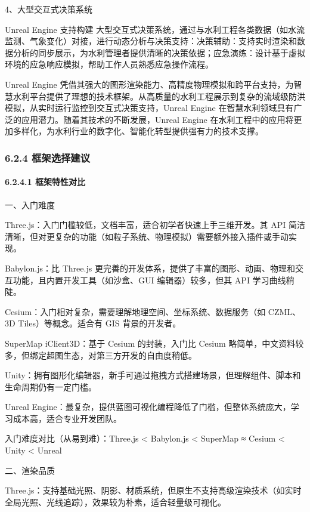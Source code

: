 4、大型交互式决策系统

Unreal Engine 支持构建 大型交互式决策系统，通过与水利工程各类数据（如水流监测、气象变化）对接，进行动态分析与决策支持：决策辅助：支持实时渲染和数据分析的同步展示，为水利管理者提供清晰的决策依据；应急演练：设计基于虚拟环境的应急响应模拟，帮助工作人员熟悉应急操作流程。

Unreal Engine 凭借其强大的图形渲染能力、高精度物理模拟和跨平台支持，为智慧水利平台提供了理想的技术框架。从高质量的水利工程展示到复杂的流域级防洪模拟，从实时运行监控到交互式决策支持，Unreal Engine 在智慧水利领域具有广泛的应用潜力。随着其技术的不断发展，Unreal Engine 在水利工程中的应用将更加多样化，为水利行业的数字化、智能化转型提供强有力的技术支撑。

\subsubsection{6.2.4 框架选择建议}\label{ux6846ux67b6ux9009ux62e9ux5efaux8bae}

\paragraph{6.2.4.1 框架特性对比}\label{ux6846ux67b6ux7279ux6027ux5bf9ux6bd4}

一、入门难度

Three.js：入门门槛较低，文档丰富，适合初学者快速上手三维开发。其 API 简洁清晰，但对更复杂的功能（如粒子系统、物理模拟）需要额外接入插件或手动实现。

Babylon.js：比 Three.js 更完善的开发体系，提供了丰富的图形、动画、物理和交互功能，且内置开发工具（如沙盒、GUI 编辑器）较多，但其 API 学习曲线稍陡。

Cesium：入门相对复杂，需要理解地理空间、坐标系统、数据服务（如 CZML、3D Tiles）等概念。适合有 GIS 背景的开发者。

SuperMap iClient3D：基于 Cesium 的封装，入门比 Cesium 略简单，中文资料较多，但绑定超图生态，对第三方开发的自由度稍低。

Unity：拥有图形化编辑器，新手可通过拖拽方式搭建场景，但理解组件、脚本和生命周期仍有一定门槛。

Unreal Engine：最复杂，提供蓝图可视化编程降低了门槛，但整体系统庞大，学习成本高，适合专业开发团队。

入门难度对比（从易到难）：Three.js \textless{} Babylon.js \textless{} SuperMap ≈ Cesium \textless{} Unity \textless{} Unreal

二、渲染品质

Three.js：支持基础光照、阴影、材质系统，但原生不支持高级渲染技术（如实时全局光照、光线追踪），效果较为朴素，适合轻量级可视化。

